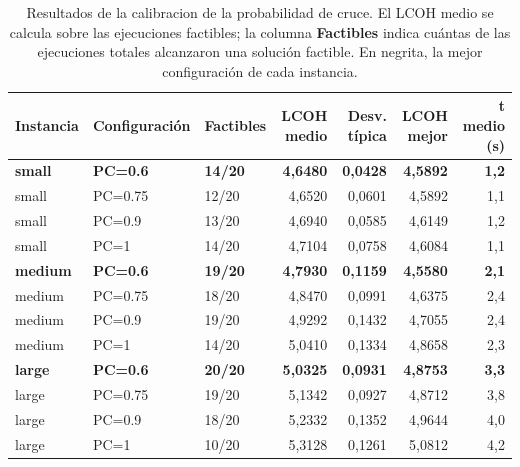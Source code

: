 \begin{table}[H]
    \centering
    \small
    \renewcommand{\arraystretch}{1.25}
    \begin{tabular}{lllrrrr}
        \hline
        \textbf{Instancia} & \textbf{Configuración} & \textbf{Factibles} & \textbf{LCOH medio} & \textbf{Desv. típica} & \textbf{LCOH mejor} & \textbf{t medio (s)} \\
        \hline
        \textbf{small} & \textbf{PC=0.6} & \textbf{14/20} & \textbf{4,6480} & \textbf{0,0428} & \textbf{4,5892} & \textbf{1,2} \\
        small & PC=0.75 & 12/20 & 4,6520 & 0,0601 & 4,5892 & 1,1 \\
        small & PC=0.9 & 13/20 & 4,6940 & 0,0585 & 4,6149 & 1,2 \\
        small & PC=1 & 14/20 & 4,7104 & 0,0758 & 4,6084 & 1,1 \\
        \hline
        \textbf{medium} & \textbf{PC=0.6} & \textbf{19/20} & \textbf{4,7930} & \textbf{0,1159} & \textbf{4,5580} & \textbf{2,1} \\
        medium & PC=0.75 & 18/20 & 4,8470 & 0,0991 & 4,6375 & 2,4 \\
        medium & PC=0.9 & 19/20 & 4,9292 & 0,1432 & 4,7055 & 2,4 \\
        medium & PC=1 & 14/20 & 5,0410 & 0,1334 & 4,8658 & 2,3 \\
        \hline
        \textbf{large} & \textbf{PC=0.6} & \textbf{20/20} & \textbf{5,0325} & \textbf{0,0931} & \textbf{4,8753} & \textbf{3,3} \\
        large & PC=0.75 & 19/20 & 5,1342 & 0,0927 & 4,8712 & 3,8 \\
        large & PC=0.9 & 18/20 & 5,2332 & 0,1352 & 4,9644 & 4,0 \\
        large & PC=1 & 10/20 & 5,3128 & 0,1261 & 5,0812 & 4,2 \\
        \hline
    \end{tabular}
    \caption{Resultados de la calibracion de la probabilidad de cruce. El LCOH medio se calcula sobre las ejecuciones factibles; la columna \textbf{Factibles} indica cuántas de las ejecuciones totales alcanzaron una solución factible. En negrita, la mejor configuración de cada instancia.}
    \label{tab:calib_e02_pc}
\end{table}
